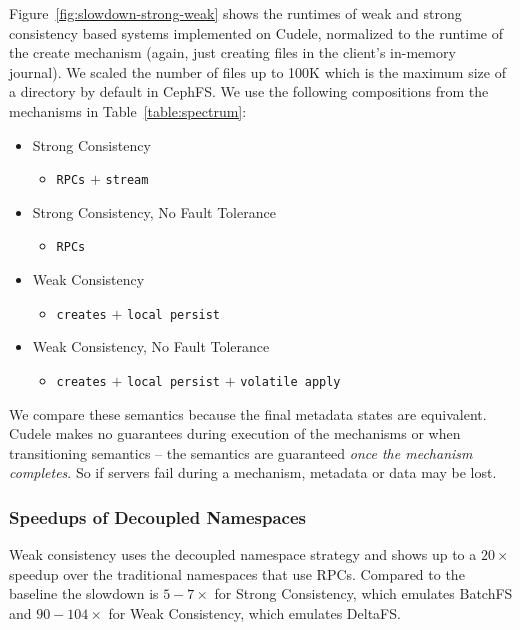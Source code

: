 Figure~\ref{fig:slowdown-strong-weak} shows the runtimes of weak and
strong consistency based systems implemented on Cudele, normalized to the
runtime of the create mechanism (again, just creating files in the client's
in-memory journal). We scaled the number of files up to 100K which is the
maximum size of a directory by default in CephFS. We use the following
compositions from the mechanisms in Table~\ref{table:spectrum}: 

\begin{itemize}
  \item Strong Consistency
  \begin{itemize}
    \item[]  \texttt{RPCs} \(+\) \texttt{stream}
  \end{itemize}
  \item Strong Consistency, No Fault Tolerance
  \begin{itemize}
    \item[] \texttt{RPCs}
  \end{itemize}
  \item Weak Consistency
  \begin{itemize}
    \item[] \texttt{creates} \(+\) \texttt{local persist}
  \end{itemize}
  \item Weak Consistency, No Fault Tolerance
  \begin{itemize}
    \item[] \texttt{creates} \(+\) \texttt{local persist} \(+\) \texttt{volatile apply}
  \end{itemize}
\end{itemize}

We compare these semantics because the final metadata states are equivalent.
Cudele makes no guarantees during execution of the mechanisms or when
transitioning semantics -- the semantics are guaranteed {\it once the mechanism
completes}. So if servers fail during a mechanism, metadata or data may be
lost.

\subsubsection{Speedups of Decoupled Namespaces} Weak consistency uses the
decoupled namespace strategy and shows up to a \(20\times\) speedup over the
traditional namespaces that use RPCs. Compared to the baseline the slowdown is
\(5-7\times\) for Strong Consistency, which emulates BatchFS and
\(90-104\times\) for Weak Consistency, which emulates DeltaFS.

